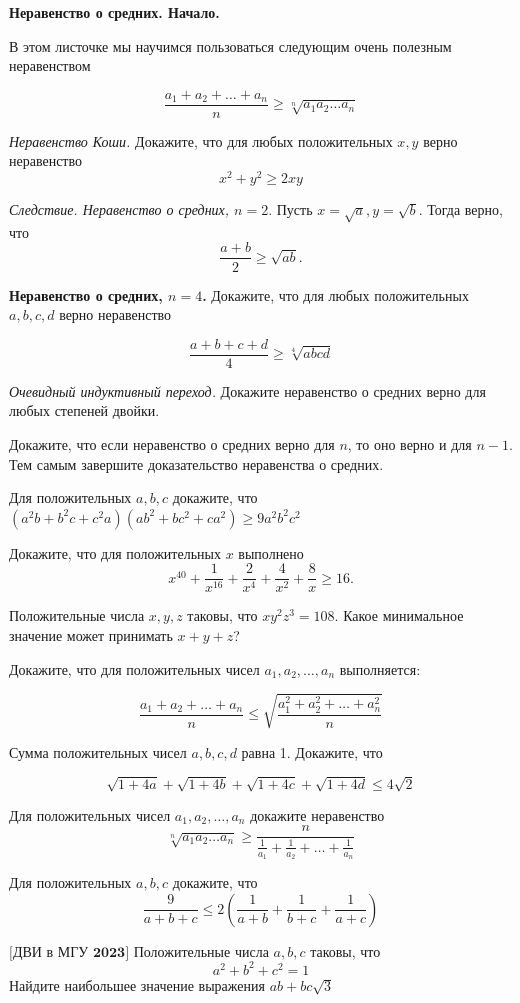 \centerline{\bf \Huge Неравенство о средних. Начало.}

\begin{flushright}
        \scriptsize{}
\end{flushright}

В этом листочке мы научимся пользоваться следующим очень полезным неравенством

\[\dfrac{a_1 + a_2 + \ldots + a_n}{n} \geq \sqrt[n]{a_1a_2\ldots a_n}\]

 \textit{Неравенство Коши.} 
Докажите, что для любых положительных $x, y$ верно неравенство 
\[x^2 + y^2 \geq 2xy\]

\textit{Следствие. Неравенство о средних, $n = 2.$} Пусть $x = \sqrt{a}, y = \sqrt{b}.$ Тогда верно, что
\[\dfrac{a+b}{2} \geq \sqrt{ab}.\]

 \textbf{Неравенство о средних, $n=4$.} Докажите, что для любых положительных $a, b, c, d$ верно неравенство

\[\dfrac{a+b+c+d}{4} \geq \sqrt[4]{abcd}\]

 \textit{Очевидный индуктивный переход.} Докажите неравенство о средних верно для любых степеней двойки.

 Докажите, что если неравенство о средних верно для $n$, то оно верно и для $n-1$. Тем самым завершите доказательство неравенства о средних.

Для положительных $a, b, c$ докажите, что
$(a^2b + b^2c + c^2a)(ab^2 + bc^2 + ca^2) \geq 9a^2b^2c^2$

Докажите, что для положительных \( x \) выполнено \[ x^{40} + \frac{1}{x^{16}} + \frac{2}{x^4} + \frac{4}{x^2} + \frac{8}{x} \geq 16.\]

Положительные числа \( x, y, z \) таковы, что \( xy^2z^3 = 108 \). Какое минимальное значение может принимать \( x + y + z \)?

\newpage

\hspace{3mm}

Докажите, что для положительных чисел $a_1, a_2, \ldots, a_n$ выполняется:

\[\dfrac{a_1+a_2+\ldots+a_n}{n} \leq \sqrt{\dfrac{a_1^2 + a_2^2 + \ldots + a_n^2}{n}}\]

Сумма положительных чисел $a, b, c, d$ равна 1. Докажите, что 

\[\sqrt{1+4a}+\sqrt{1+4b}+\sqrt{1+4c}+\sqrt{1+4d} \leq 4\sqrt{2}\]

Для положительных чисел \( a_1, a_2, \ldots, a_n \) докажите неравенство
\[
\sqrt[n]{a_1 a_2 \ldots a_n} \geq \frac{n}{\frac{1}{a_1} + \frac{1}{a_2} + \ldots + \frac{1}{a_n}}
\]

Для положительных \( a, b, c \) докажите, что
\[
\frac{9}{a + b + c} \leq 2 \left( \frac{1}{a + b} + \frac{1}{b + c} + \frac{1}{a + c} \right)
\]

$\bigl[\textbf{ДВИ в МГУ 2023}\bigr]$
Положительные числа $a,b,c$ таковы, что
\[a^2 + b^2 + c^2 = 1\]
Найдите наибольшее значение выражения $ab + bc\sqrt{3}$